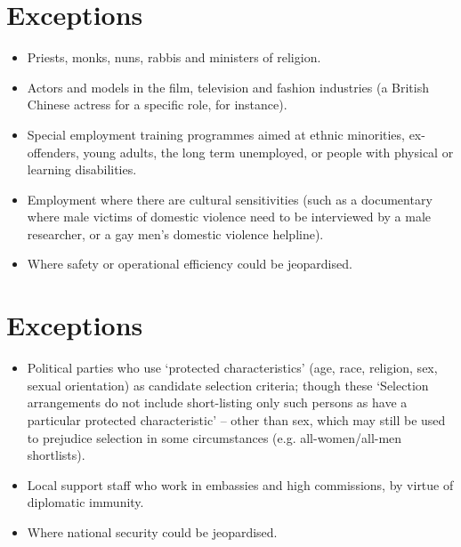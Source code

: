 \documentclass{article}
\begin{document}
\section{Exceptions}
\begin{itemize}
\item     Priests, monks, nuns, rabbis and ministers of religion.
\item     Actors and models in the film, television and fashion industries (a British Chinese actress for a specific role, for instance).
\item     Special employment training programmes aimed at ethnic minorities, ex-offenders, young adults, the long term unemployed, or people with physical or learning disabilities.
\item     Employment where there are cultural sensitivities (such as a documentary where male victims of domestic violence need to be interviewed by a male researcher, or a gay men's domestic violence helpline).
\item     Where safety or operational efficiency could be jeopardised.
\end{itemize}



\section{Exceptions}
\begin{itemize}
\item     Political parties who use `protected characteristics' (age, race, religion, sex, sexual orientation) as candidate selection criteria; though these `Selection arrangements do not include short-listing only such persons as have a particular protected characteristic' -- other than sex, which may still be used to prejudice selection in some circumstances (e.g. all-women/all-men shortlists).
\item     Local support staff who work in embassies and high commissions, by virtue of diplomatic immunity.
\item     Where national security could be jeopardised.
\end{itemize}
\end{document}

